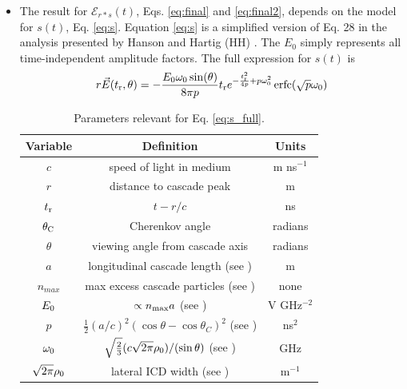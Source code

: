 \documentclass[amsmath,amssymb,aps,prd,10pt,twocolumn,showkeys]{revtex4}
\DeclareMathOperator\erfc{erfc}
\begin{document}
\begin{itemize}
\item The result for $\mathcal{E}_{r*s}(t)$, Eqs. \ref{eq:final} and \ref{eq:final2}, depends on the model for $s(t)$, Eq. \ref{eq:s}.  Equation \ref{eq:s} is a simplified version of Eq. 28 in the analysis presented by Hanson and Hartig (HH) \cite{PhysRevD.105.123019}.  The $E_0$ simply represents all time-independent amplitude factors.  The full expression for $s(t)$ is
\begin{equation}
r\vec{E}(t_{\rm r},\theta) = -\frac{E_0\omega_0 \sin(\theta)}{8\pi p}t_{\rm r}e^{-\frac{t_{\rm r}^2}{4p}+p\omega_0^2}\erfc(\sqrt{p}\omega_0) \label{eq:s_full}
\end{equation}
\begin{table}
\begin{tabular}{| c | c | c |} \hline
\textbf{Variable} & \textbf{Definition} & \textbf{Units}\\ \hline
$c$ & speed of light in medium & m ns$^{-1}$ \\ 
$r$ & distance to cascade peak & m \\
$t_{\rm r}$ & $t-r/c$ & ns \\
$\theta_{\rm C}$ & Cherenkov angle & radians \\ 
$\theta$ & viewing angle from cascade axis & radians \\ 
$a$ & longitudinal cascade length (see \cite{10.1103/physrevd.65.016003}) & m \\ 
$n_{max}$ & max excess cascade particles (see \cite{10.1103/physrevd.65.016003})  & none \\
$E_{\rm 0}$ & $\propto n_{\rm max}a$ (see \cite{10.1103/physrevd.65.016003}) & V GHz$^{-2}$ \\
$p$ & $\frac{1}{2}(a/c)^2 \left(\cos\theta - \cos\theta_C\right)^2$ (see \cite{PhysRevD.105.123019}) & ns$^2$ \\ 
$\omega_{\rm 0}$ & $\sqrt{\frac{2}{3}} (c\sqrt{2\pi}\rho_{\rm 0})/(\sin\theta)$ (see \cite{10.1016/j.astropartphys.2017.03.008}) & GHz \\
$\sqrt{2\pi}\rho_{\rm 0}$ & lateral ICD width (see \cite{10.1016/j.astropartphys.2017.03.008}) & m$^{-1}$ \\ \hline
\end{tabular}
\caption{\label{tab:param} Parameters relevant for Eq. \ref{eq:s_full}.}
\end{table}


\end{itemize}
\end{document}
